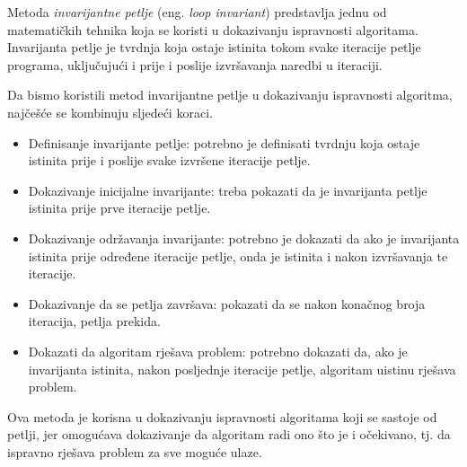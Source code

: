 Metoda \textit{invarijantne petlje} (eng. \textit{{loop} {invariant}}) predstavlja jednu od matematičkih tehnika koja se koristi u dokazivanju ispravnosti algoritama. Invarijanta petlje je tvrdnja koja ostaje istinita tokom svake iteracije petlje programa, uključujući i prije i poslije izvršavanja naredbi u iteraciji.

Da bismo koristili metod invarijantne petlje u dokazivanju ispravnosti algoritma, najčešće se kombinuju sljedeći koraci.

\begin{itemize}
	\item  Definisanje invarijante petlje: potrebno je definisati tvrdnju koja ostaje istinita prije i poslije svake izvršene iteracije petlje.
   \item Dokazivanje inicijalne invarijante: treba pokazati da je invarijanta petlje istinita prije prve iteracije petlje.
   \item Dokazivanje održavanja invarijante: potrebno je dokazati da ako je invarijanta istinita prije određene iteracije petlje, onda je istinita i nakon izvršavanja te iteracije.
   \item Dokazivanje da se petlja završava: pokazati da se nakon konačnog broja iteracija, petlja prekida.
   \item Dokazati da algoritam rješava problem: potrebno dokazati da, ako je invarijanta istinita, nakon posljednje iteracije petlje, algoritam uistinu rješava problem.
\end{itemize}

Ova metoda je korisna u dokazivanju ispravnosti algoritama koji se sastoje od petlji, jer omogućava dokazivanje da algoritam radi ono što je i očekivano, tj. da ispravno rješava problem za sve moguće ulaze.

